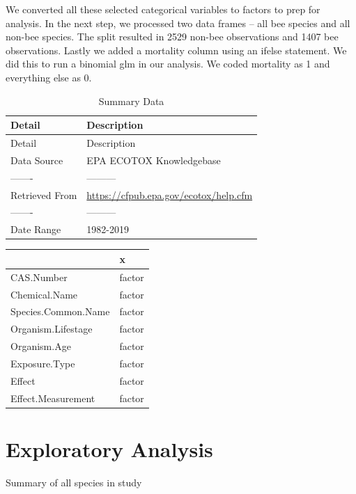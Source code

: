 \documentclass[
  12pt,
]{article}
\begin{document}
We converted all these selected categorical variables to factors to prep
for analysis. In the next step, we processed two data frames -- all bee
species and all non-bee species. The split resulted in 2529 non-bee
observations and 1407 bee observations. Lastly we added a mortality
column using an ifelse statement. We did this to run a binomial glm in
our analysis. We coded mortality as 1 and everything else as 0.

\begin{longtable}[]{@{}ll@{}}
\caption{Summary Data}\tabularnewline
\toprule
Detail & Description \\
\midrule
\endfirsthead
\toprule
Detail & Description \\
\midrule
\endhead
Data Source & EPA ECOTOX Knowledgebase \\
------- & --------- \\
Retrieved From & \url{https://cfpub.epa.gov/ecotox/help.cfm} \\
------- & --------- \\
Date Range & 1982-2019 \\
\bottomrule
\end{longtable}

\begin{longtable}[]{@{}ll@{}}
\toprule
& x \\
\midrule
\endhead
CAS.Number & factor \\
Chemical.Name & factor \\
Species.Common.Name & factor \\
Organism.Lifestage & factor \\
Organism.Age & factor \\
Exposure.Type & factor \\
Effect & factor \\
Effect.Measurement & factor \\
\bottomrule
\end{longtable}

\newpage

\hypertarget{exploratory-analysis}{%
\section{Exploratory Analysis}\label{exploratory-analysis}}

Summary of all species in study
\end{document}
